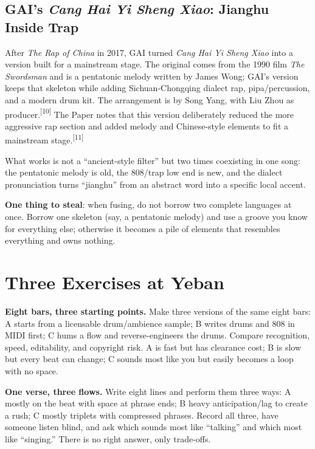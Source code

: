 \subsection{GAI's \emph{Cang Hai Yi Sheng Xiao}: Jianghu Inside Trap}
\label{sec:hiphop-case-gai}

After \emph{The Rap of China} in 2017, GAI turned \emph{Cang Hai Yi Sheng Xiao} into a version built for a mainstream stage. The original comes from the 1990 film \emph{The Swordsman} and is a pentatonic melody written by James Wong; GAI's version keeps that skeleton while adding Sichuan-Chongqing dialect rap, pipa/percussion, and a modern drum kit. The arrangement is by Song Yang, with Liu Zhou as producer.{\textsuperscript{[10]}} The Paper notes that this version deliberately reduced the more aggressive rap section and added melody and Chinese-style elements to fit a mainstream stage.{\textsuperscript{[11]}}

What works is not a ``ancient-style filter'' but two times coexisting in one song: the pentatonic melody is old, the 808/trap low end is new, and the dialect pronunciation turns ``jianghu'' from an abstract word into a specific local accent.

\textbf{One thing to steal}: when fusing, do not borrow two complete languages at once. Borrow one skeleton (say, a pentatonic melody) and use a groove you know for everything else; otherwise it becomes a pile of elements that resembles everything and owns nothing.

\section{Three Exercises at Yeban}
\label{sec:hiphop-practice}

\begin{exercise}
\textbf{Eight bars, three starting points.} Make three versions of the same eight bars: A starts from a licensable drum/ambience sample; B writes drums and 808 in MIDI first; C hums a flow and reverse-engineers the drums. Compare recognition, speed, editability, and copyright risk. A is fast but has clearance cost; B is slow but every beat can change; C sounds most like you but easily becomes a loop with no space.
\end{exercise}

\begin{exercise}
\textbf{One verse, three flows.} Write eight lines and perform them three ways: A mostly on the beat with space at phrase ends; B heavy anticipation/lag to create a rush; C mostly triplets with compressed phrases. Record all three, have someone listen blind, and ask which sounds most like ``talking'' and which most like ``singing.'' There is no right answer, only trade-offs.
\end{exercise}

